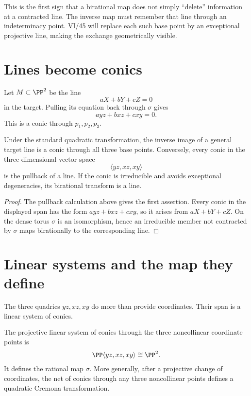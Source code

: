 This is the first sign that a birational map does not simply ``delete'' information at a contracted line.  The inverse map must remember that line through an indeterminacy point.  VI/45 will replace each such base point by an exceptional projective line, making the exchange geometrically visible.

\section{Lines become conics}

Let \(M\subset\PP^2\) be the line
\[
  aX+bY+cZ=0
\]
in the target.  Pulling its equation back through \(\sigma\) gives
\[
  ayz+bxz+cxy=0.
\]
This is a conic through \(p_1,p_2,p_3\).

\begin{proposition}\label{prop:vi44-line-to-conic}
Under the standard quadratic transformation, the inverse image of a general target line is a conic through all three base points.  Conversely, every conic in the three-dimensional vector space
\[
  \langle yz,xz,xy\rangle
\]
is the pullback of a line.  If the conic is irreducible and avoids exceptional degeneracies, its birational transform is a line.
\end{proposition}

\begin{proof}
The pullback calculation above gives the first assertion.  Every conic in the displayed span has the form \(ayz+bxz+cxy\), so it arises from \(aX+bY+cZ\).  On the dense torus \(\sigma\) is an isomorphism, hence an irreducible member not contracted by \(\sigma\) maps birationally to the corresponding line.
\end{proof}



\section{Linear systems and the map they define}

The three quadrics \(yz,xz,xy\) do more than provide coordinates.  Their span is a linear system of conics.

\begin{proposition}\label{prop:vi44-conics-linear-system}
The projective linear system of conics through the three noncollinear coordinate points is
\[
  \PP\langle yz,xz,xy\rangle\cong\PP^2.
\]
It defines the rational map \(\sigma\).  More generally, after a projective change of coordinates, the net of conics through any three noncollinear points defines a quadratic Cremona transformation.
\end{proposition}

